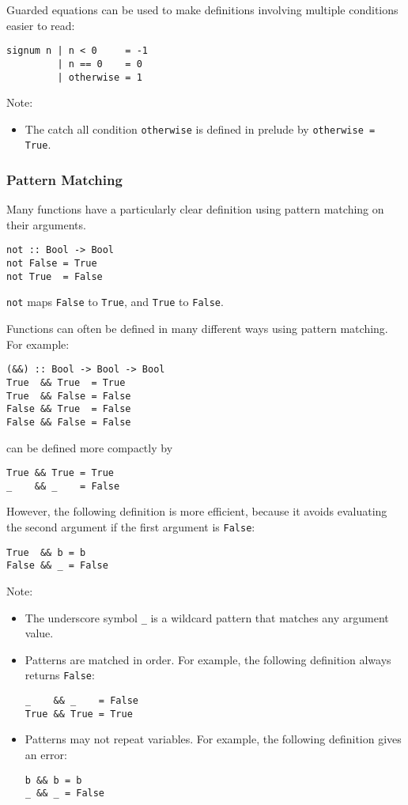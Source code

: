 \begin{multicols}{2}
Guarded equations can be used to make definitions involving multiple conditions easier to read:
\begin{lstlisting}
signum n | n < 0     = -1
         | n == 0    = 0
         | otherwise = 1
\end{lstlisting}
Note:
\begin{itemize}
  \item The catch all condition \lstinline{otherwise} is defined in prelude by \lstinline{otherwise = True}.
\end{itemize}

\subsubsection{Pattern Matching}
Many functions have a particularly clear definition using pattern matching on their arguments.
\begin{lstlisting}
not :: Bool -> Bool
not False = True
not True  = False
\end{lstlisting}
\lstinline{not} maps \lstinline{False} to \lstinline{True}, and \lstinline{True} to \lstinline{False}.

Functions can often be defined in many different ways using pattern matching. For example:
\begin{lstlisting}
(&&) :: Bool -> Bool -> Bool
True  && True  = True
True  && False = False
False && True  = False
False && False = False
\end{lstlisting}
can be defined more compactly by
\begin{lstlisting}
True && True = True
_    && _    = False
\end{lstlisting}
However, the following definition is more efficient, because it avoids evaluating the second argument if the first argument is \lstinline{False}:
\begin{lstlisting}
True  && b = b
False && _ = False
\end{lstlisting}

Note:
\begin{itemize}
  \item The underscore symbol \lstinline{_} is a wildcard pattern that matches any argument value.
  \item Patterns are matched in order. For example, the following definition always returns \lstinline{False}:
\begin{lstlisting}
_    && _    = False
True && True = True
\end{lstlisting}
  \item Patterns may not repeat variables. For example, the following definition gives an error:
\begin{lstlisting}
b && b = b
_ && _ = False
\end{lstlisting}
\end{itemize}


\end{multicols}
